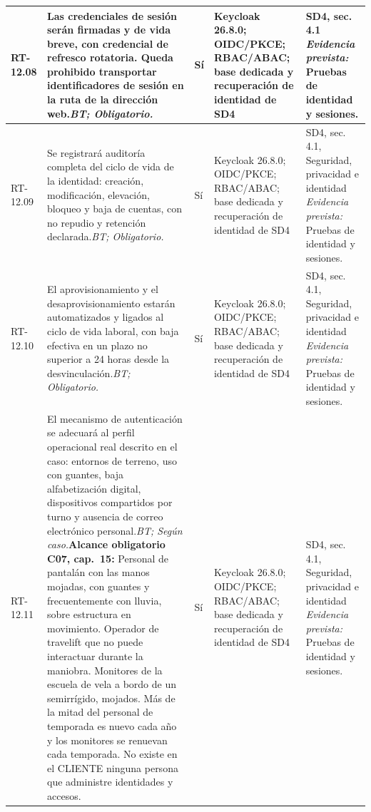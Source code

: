 \begin{paginaHorizontalSynaptix}
\begin{longtable}{|L{0.09\AnchoMatrizTDoce}|L{0.385\AnchoMatrizTDoce}|L{0.065\AnchoMatrizTDoce}|L{0.18\AnchoMatrizTDoce}|L{0.28\AnchoMatrizTDoce}|}
RT-\allowbreak{}12.\allowbreak{}08 &
Las credenciales de sesión serán firmadas y de vida breve, con credencial de refresco rotatoria. Queda prohibido transportar identificadores de sesión en la ruta de la dirección web.\newline\textit{BT; Obligatorio.} &
Sí &
Keycloak 26.8.0; OIDC/PKCE; RBAC/ABAC; base dedicada y recuperación de identidad de SD4 &
SD4, sec. 4.1 \newline\textit{Evidencia prevista:} Pruebas de identidad y sesiones. \\ \hline

RT-\allowbreak{}12.\allowbreak{}09 &
Se registrará auditoría completa del ciclo de vida de la identidad: creación, modificación, elevación, bloqueo y baja de cuentas, con no repudio y retención declarada.\newline\textit{BT; Obligatorio.} &
Sí &
Keycloak 26.8.0; OIDC/PKCE; RBAC/ABAC; base dedicada y recuperación de identidad de SD4 &
SD4, sec. 4.1, Seguridad, privacidad e identidad \newline\textit{Evidencia prevista:} Pruebas de identidad y sesiones. \\ \hline

RT-\allowbreak{}12.\allowbreak{}10 &
El aprovisionamiento y el desaprovisionamiento estarán automatizados y ligados al ciclo de vida laboral, con baja efectiva en un plazo no superior a 24 horas desde la desvinculación.\newline\textit{BT; Obligatorio.} &
Sí &
Keycloak 26.8.0; OIDC/PKCE; RBAC/ABAC; base dedicada y recuperación de identidad de SD4 &
SD4, sec. 4.1, Seguridad, privacidad e identidad \newline\textit{Evidencia prevista:} Pruebas de identidad y sesiones. \\ \hline

RT-\allowbreak{}12.\allowbreak{}11 &
El mecanismo de autenticación se adecuará al perfil operacional real descrito en el caso: entornos de terreno, uso con guantes, baja alfabetización digital, dispositivos compartidos por turno y ausencia de correo electrónico personal.\newline\textit{BT; Según caso.}\newline\textbf{Alcance obligatorio C07, cap.~15:} Personal de pantalán con las manos mojadas, con guantes y frecuentemente con lluvia, sobre estructura en movimiento. Operador de travelift que no puede interactuar durante la maniobra. Monitores de la escuela de vela a bordo de un semirrígido, mojados. Más de la mitad del personal de temporada es nuevo cada año y los monitores se renuevan cada temporada. No existe en el CLIENTE ninguna persona que administre identidades y accesos. &
Sí &
Keycloak 26.8.0; OIDC/PKCE; RBAC/ABAC; base dedicada y recuperación de identidad de SD4 &
SD4, sec. 4.1, Seguridad, privacidad e identidad \newline\textit{Evidencia prevista:} Pruebas de identidad y sesiones. \\ \hline


\end{longtable}
\end{paginaHorizontalSynaptix}
